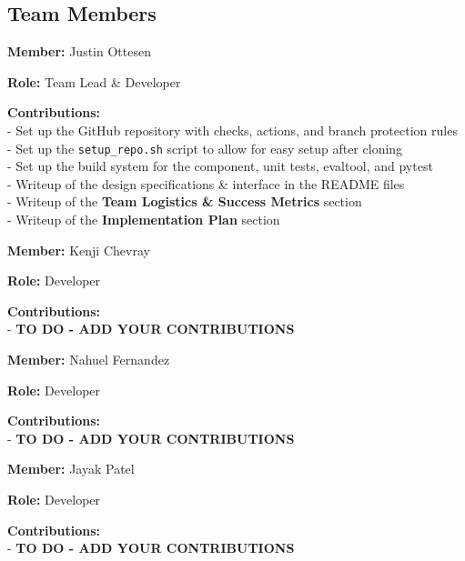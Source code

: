 \subsection*{Team Members}

\textbf{Member:} Justin Ottesen

\smallskip

\textbf{Role:} Team Lead \& Developer

\smallskip

\textbf{Contributions:} \\
- Set up the GitHub repository with checks, actions, and branch protection rules \\
- Set up the \verb|setup_repo.sh| script to allow for easy setup after cloning \\
- Set up the build system for the component, unit tests, evaltool, and pytest \\
- Writeup of the design specifications \& interface in the README files \\
- Writeup of the \textbf{Team Logistics \& Success Metrics} section \\
- Writeup of the \textbf{Implementation Plan} section

\bigskip

\textbf{Member:} Kenji Chevray

\smallskip

\textbf{Role:} Developer

\smallskip

\textbf{Contributions:} \\
- \color{red} \textbf{TO DO - ADD YOUR CONTRIBUTIONS} \color{black}

\bigskip

\textbf{Member:} Nahuel Fernandez

\smallskip

\textbf{Role:} Developer

\smallskip

\textbf{Contributions:} \\
- \color{red} \textbf{TO DO - ADD YOUR CONTRIBUTIONS} \color{black}


\bigskip

\textbf{Member:} Jayak Patel

\smallskip

\textbf{Role:} Developer

\smallskip

\textbf{Contributions:} \\
- \color{red} \textbf{TO DO - ADD YOUR CONTRIBUTIONS} \color{black}


